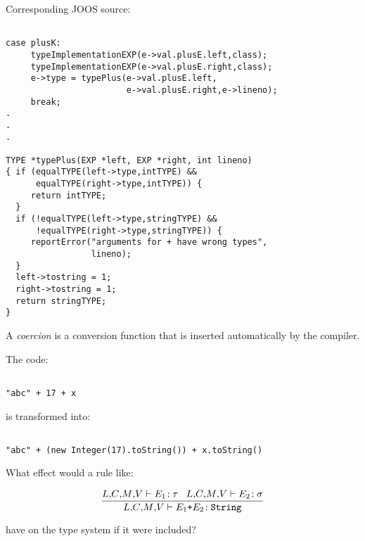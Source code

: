 \begin{slide*}
Corresponding JOOS source:
 
\begin{scriptsize}
\begin{verbatim}
 
case plusK:
     typeImplementationEXP(e->val.plusE.left,class);
     typeImplementationEXP(e->val.plusE.right,class);
     e->type = typePlus(e->val.plusE.left,
                        e->val.plusE.right,e->lineno);
     break;
.
.
.

TYPE *typePlus(EXP *left, EXP *right, int lineno)
{ if (equalTYPE(left->type,intTYPE) && 
      equalTYPE(right->type,intTYPE)) {
     return intTYPE;
  }
  if (!equalTYPE(left->type,stringTYPE) && 
      !equalTYPE(right->type,stringTYPE)) {
     reportError("arguments for + have wrong types",
                 lineno);
  }
  left->tostring = 1;
  right->tostring = 1;
  return stringTYPE;
}
\end{verbatim}
\end{scriptsize}
\vfil
\end{slide*}
 
\begin{slide*}
A {\em coercion\/} is a conversion function that is inserted
automatically by the compiler. 

The code:

\begin{scriptsize}
\begin{verbatim}

"abc" + 17 + x

\end{verbatim}
\end{scriptsize}

is transformed into:

\begin{scriptsize}
\begin{verbatim}

"abc" + (new Integer(17).toString()) + x.toString()

\end{verbatim}
\end{scriptsize}

What effect would a rule like:

$$ \frac{\lib{},\!\class{},\!\method{},\!\vars{} \vdash E_1\!: \tau\;\;\;
         \lib{},\!\class{},\!\method{},\!\vars{} \vdash E_2\!: \sigma}{
         \lib{},\!\class{},\!\method{},\!\vars{} \vdash E_1 \mbox{\tt +} E_2\!: \mbox{\tt String}} $$

have on the type system if it were included?

\vfil
\end{slide*}
 
